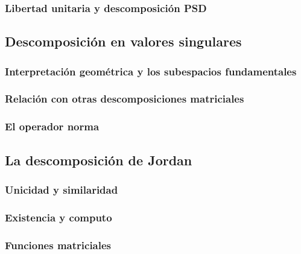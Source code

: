 \subsubsection{Libertad unitaria y descomposición PSD} %
\label{ssub:libertad_unitaria_y_descomposicion_psd}

\subsection{Descomposición en valores singulares} %
\label{sub:descomposicion_en_valores_singulares}

\subsubsection{Interpretación geométrica y los subespacios fundamentales} %
\label{ssub:interpretacion_geometrica_y_los_subespacios_fundamentales}

\subsubsection{Relación con otras descomposiciones matriciales} %
\label{ssub:relacion_con_otras_descomposiciones_matriciales}

\subsubsection{El operador norma} %
\label{ssub:el_operador_norma}

\subsection{La descomposición de Jordan} %
\label{sub:la_descomposicion_de_jordan}

\subsubsection{Unicidad y similaridad} %
\label{ssub:unicidad_y_similaridad}

\subsubsection{Existencia y computo} %
\label{ssub:existencia_y_computo}

\subsubsection{Funciones matriciales} %
\label{ssub:funciones_matriciales}

